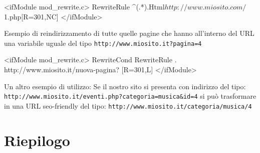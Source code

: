 \begin{code}
<ifModule mod_rewrite.c>
RewriteRule ^(.*).Html$ http://www.miosito.com/$1.php[R=301,NC]
</ifModule>
\end{code}

Esempio di reindirizzamento di tutte quelle pagine che hanno all'interno del URL una variabile uguale del tipo \verb|http://www.miosito.it?pagina=4|

\begin{code}
<ifModule mod_rewrite.c>
RewriteCond %
RewriteRule . http://www.miosito.it/nuova-pagina? [R=301,L]
</ifModule>
\end{code}

Un altro esempio di utilizzo: Se il nostro sito si presenta con indirizzo del tipo:  \verb|http://www.miosito.it/eventi.php?categoria=musica&id=4| si può trasformare in una \ac{URL} seo-friendly del tipo: \verb|http://www.miosito.it/categoria/musica/4|


\section{Riepilogo}
\omissis